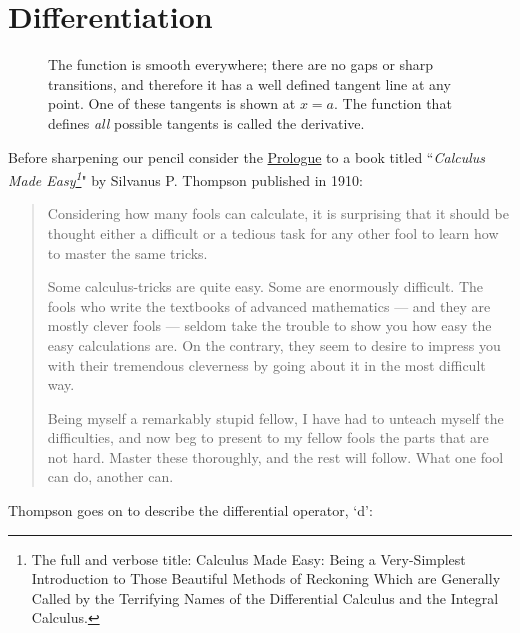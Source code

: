 \chapter[Differentiation]{Differentiation}


\begin{figure}[h]\begin{center}
		\caption{The function is smooth everywhere; there are no gaps or sharp transitions, and therefore it has a well defined tangent line at any point. One of these tangents is shown at $x=a$. The function that defines \textit{all} possible tangents is called the derivative.}\end{center}
\end{figure}

\vspace{1cm}
Before sharpening our pencil consider the \href{https://calculusmadeeasy.org/prologue.html}{Prologue} to a book titled ``\emph{Calculus Made Easy\footnote{The full and verbose title: Calculus Made Easy: Being a Very-Simplest Introduction to Those Beautiful Methods of Reckoning Which are Generally Called by the Terrifying Names of the Differential Calculus and the Integral Calculus.}}" by Silvanus P. Thompson published in 1910:

\begin{quotation}
	Considering how many fools can calculate, it is surprising that it should be thought either a difficult or a tedious task for any other fool to learn how to master the same tricks.

	Some calculus-tricks are quite easy. Some are enormously difficult. The fools who write the textbooks of advanced mathematics — and they are mostly clever fools — seldom take the trouble to show you how easy the easy calculations are. On the contrary, they seem to desire to impress you with their tremendous cleverness by going about it in the most difficult way.

	Being myself a remarkably stupid fellow, I have had to unteach myself the difficulties, and now beg to present to my fellow fools the parts that are not hard. Master these thoroughly, and the rest will follow. What one fool can do, another can.
\end{quotation}
\clearpage
Thompson goes on to describe the differential operator, `d':

